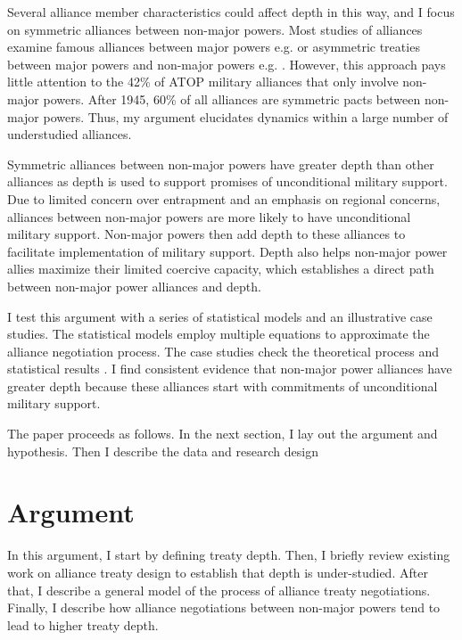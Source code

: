 \documentclass[12pt]{article}
\begin{document}
Several alliance member characteristics could affect depth in this way, and I focus on symmetric alliances between non-major powers. 
Most studies of alliances examine famous alliances between major powers e.g. \citep{Snyder1997} or asymmetric treaties between major powers and non-major powers e.g. \citep{Morrow1991, Yarhi-Miloetal2016}. 
However, this approach pays little attention to the 42\% of ATOP military alliances that only involve non-major powers. %
After 1945, 60\% of all alliances are symmetric pacts between non-major powers. %
Thus, my argument elucidates dynamics within a large number of understudied alliances. 

Symmetric alliances between non-major powers have greater depth than other alliances as depth is used to support promises of unconditional military support. 
Due to limited concern over entrapment and an emphasis on regional concerns, alliances between non-major powers are more likely to have unconditional military support. 
Non-major powers then add depth to these alliances to facilitate implementation of military support. %
Depth also helps non-major power allies maximize their limited coercive capacity, which establishes a direct path between non-major power alliances and depth. %


I test this argument with a series of statistical models and an illustrative case studies.
The statistical models employ multiple equations to approximate the alliance negotiation process. 
The case studies check the theoretical process and statistical results \citep{Seawright2016}. 
I find consistent evidence that non-major power alliances have greater depth because these alliances start with commitments of unconditional military support. 


The paper proceeds as follows. 
In the next section, I lay out the argument and hypothesis. 
Then I describe the data and research design 


\section{Argument}


In this argument, I start by defining treaty depth. 
Then, I briefly review existing work on alliance treaty design to establish that depth is under-studied. 
After that, I describe a general model of the process of alliance treaty negotiations. 
Finally, I describe how alliance negotiations between non-major powers tend to lead to higher treaty depth. 
\end{document}
